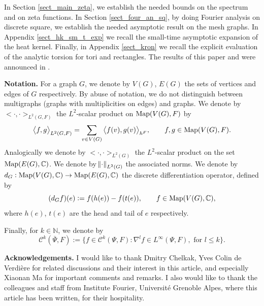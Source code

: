 \documentclass[12pt]{article}
\numberwithin{equation}{section}
\theoremstyle{theorem}
\theoremstyle{definition}
\theoremstyle{remark}
\newcommand{\comp}{\mathbb{C}}
\newcommand{\nat}{\mathbb{N}}
\newcommand{\ccal}{\mathscr{C}}
\newcommand{\scal}[2]{\big< #1, #2 \big>}
\begin{document}
	In Section \ref{sect_main_zeta}, we establish the needed bounds on the spectrum and on zeta functions.
	In Section \ref{sect_four_an_sq}, by doing Fourier analysis on discrete square, we establish the needed asymptotic result on the mesh graphs.
	In Appendix \ref{sect_hk_sm_t_exp} we recall the small-time asymptotic expansion of the heat kernel.
	Finally, in Appendix \ref{sect_kron} we recall the explicit evaluation of the analytic torsion for tori and rectangles.
	The results of this paper and \cite{FinFinDiffer} were announced in \cite{FinDetCRAS}.	
	\par 
	\textbf{Notation.}
	For a graph $G$, we denote by $V(G)$, $E(G)$ the sets of vertices and edges of $G$ respectively.
	By abuse of notation, we do not distinguish between multigraphs (graphs with multiplicities on edges) and graphs.
	We denote by $\scal{\cdot}{\cdot}_{L^2(G, F)}$ the $L^2$-scalar product on ${\rm{Map}}(V(G), F)$ by
	\begin{equation}
		\scal{f}{g}_{L^2(G, F)} = \sum_{v \in V(G)} \scal{f(v)}{g(v)}_{h^F}, \qquad f, g \in {\rm{Map}}(V(G), F).
	\end{equation}
	Analogically we denote by $\scal{\cdot}{\cdot}_{L^2(G)}$ the $L^2$-scalar product on the set ${\rm{Map}}(E(G), \comp)$.
	We denote by $\norm{\cdot}_{L^2(G)}$ the associated norms.
	We denote by $d_{G} : {\rm{Map}}(V(G), \comp) \to {\rm{Map}}(E(G), \comp)$ the discrete differentiation operator, defined by
	\begin{equation}
		(d_{G}f)(e) := f(h(e)) - f(t(e)), \qquad f \in {\rm{Map}}(V(G), \comp),
	\end{equation}
	where $h(e)$, $t(e)$ are the head and tail of $e$ respectively.
	\par 
	Finally, for $k \in \nat$, we denote by 
	\begin{equation}\label{eq_defn_ck_b}
		\ccal^{k}(\overline{\Psi}, F) := \Big \{ 
			f \in \ccal^{k}(\Psi, F) : \nabla^l f \in L^{\infty}(\Psi, F), \text{ for }l \leq k
		\Big \}.
	\end{equation}
	\par
	\textbf{Acknowledgements.} I would like to thank Dmitry Chelkak, Yves Colin de Verdière for related discussions and their interest in this article, and especially Xiaonan Ma for important comments and remarks. I also would like to thank the colleagues and staff from Institute Fourier, Université Grenoble Alpes, where this article has been written, for their hospitality.
\end{document}
